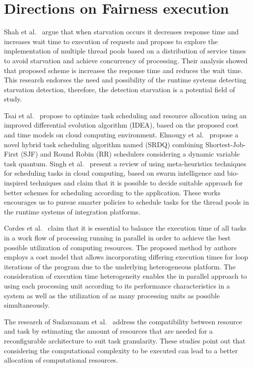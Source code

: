 \section{{Directions on Fairness execution}}
\label{sec:directions_fairness}
Shah et al.~\cite{shah2017} argue that when starvation occurs it decreases response time and increases wait time to execution of requests and propose to explore the implementation of multiple thread pools based on a distribution of service times to avoid starvation and achieve concurrency of processing. Their analysis showed that proposed scheme is increases the response time and reduces the wait time. This research endorses the need and possibility of the runtime systems detecting starvation detection, therefore, the detection starvation is a potential field of study.

Tsai et al.~\cite{tsai2013} propose to optimize task scheduling and resource allocation using an improved differential evolution algorithm (IDEA), based on the proposed cost and time models on cloud computing environment. Elmougy et al.~\cite{elmougy2017} propose a novel hybrid task scheduling algorithm named (SRDQ) combining Shortest-Job-First (SJF) and Round Robin (RR) schedulers considering a dynamic variable task quantum. Singh et al.~\cite{singh2017} present a review of using meta-heuristics techniques for scheduling tasks in cloud computing, based on swarm intelligence and bio-inspired techniques and claim that it is possible to decide suitable approach for better schemes for scheduling according to the application. These works encourages us to pursue smarter policies to schedule tasks for the thread pools in the runtime systems of integration platforms.

Cordes et al.~\cite{cordes2011} claim that it is essential to balance the execution time of all tasks in a work flow of processing running in parallel in order to achieve the best possible utilization of computing resources. The proposed method by authors employs a cost model that allows incorporating differing execution times for loop iterations of the program due to the underlying heterogeneous platform. The consideration of execution time heterogeneity enables the in parallel approach to using each processing unit according to its performance characteristics in a system as well as the utilization of as many processing units as possible simultaneously.

The research of Sudarsanam et al.~\cite{sudarsanam2004} address the compatibility between resource and task by estimating the amount of resources that are needed for a reconfigurable architecture to suit task granularity. These studies point out that considering the computational complexity to be executed can lead to a better allocation of computational resources.